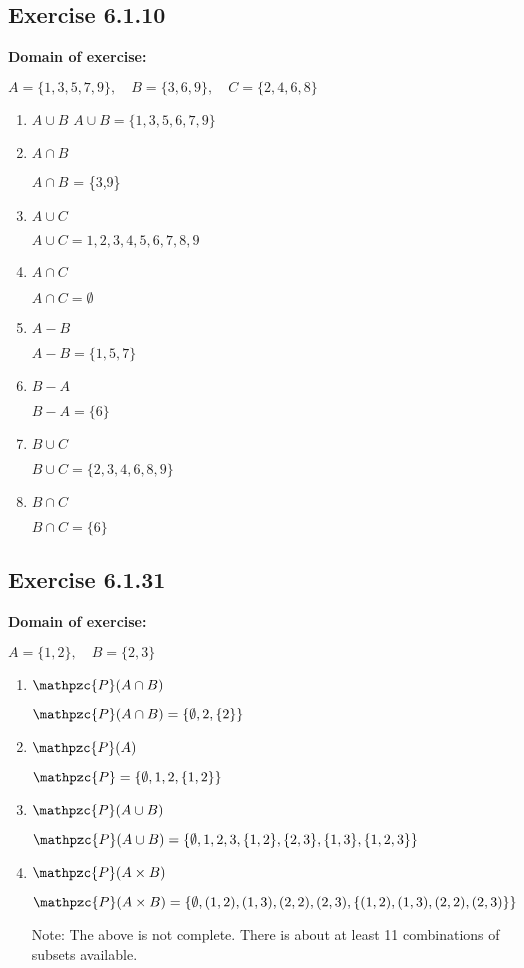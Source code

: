 \documentclass{article}
\newcommand{\cent}[1]{\begin{center}#1\end{center}}
\newcommand{\script}[1]{\mathpzc{#1}}
\newcommand{\Domain}{\textbf{Domain of exercise: }}
\newcommand{\Exercise}[1]{\subsection{Exercise #1}}
\begin{document}
		\Exercise{6.1.10}
		
		\Domain
		\cent{$A = \{1,3,5,7,9\}, \quad B = \{3,6,9\}, \quad C = \{2,4,6,8\}$}
				
		
		\begin{enumerate}[label = \textbf{\alph*.}]
			\item $A \cup B$
			$A \cup B = \{1,3,5,6,7,9\}$
			
			\item $A \cap B$
			
			$A \cap B$ = \{3,9\}
			
			\item $A \cup C$
			
			\cent{$A \cup C = 1,2,3,4,5,6,7,8,9$}
			
			\item $A \cap C$
			
			\cent{$A \cap C = \emptyset$}
			
			\item $A-B$
			
			\cent{$A-B = \{1,5,7\}$}
			
			\item $B-A$
			
			\cent{$B - A = \{6\}$}
			
			\item $B \cup C$
			
			\cent{$B \cup C = \{2,3,4,6,8,9\}$}
			
			\item $B \cap C$
			
			\cent{$B \cap C = \{6\}$}
		\end{enumerate}
		
		\Exercise{6.1.31}
		
		\Domain
		
		\cent{$A = \{1,2\}, \quad B = \{2,3\}$}
		
		\begin{enumerate}[label = \textbf{\alph*.}]
			\item $\script{P}(A \cap B)$
			
			\cent{$\script{P}(A \cap B) = \{\emptyset,2,\{2\}\}$}
			
			\item $\script{P}(A)$
			
			\cent{$\script{P} = \{\emptyset,1,2,\{1,2\}\}$}
			
			\item $\script{P}(A \cup B)$
			
			\cent{$\script{P}(A \cup B) = \{\emptyset,1,2,3,\{1,2\},\{2,3\},\{1,3\},\{1,2,3\}\}$}
			
			\item $\script{P}(A \times B)$
			
			\cent{$\script{P}(A \times B) = \{\emptyset,(1,2),(1,3),(2,2),(2,3),\{(1,2),(1,3),(2,2),(2,3)\}\}$}
			
			Note: The above is not complete. There is about at least 11 combinations of subsets available.
		\end{enumerate}
	
\end{document}

